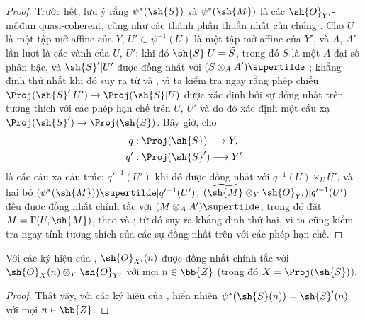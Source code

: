 \documentclass[oneside,10pt]{amsart}
\makeatletter
\newcommand{\ega@arrow}[2]{\mathchoice{#1}{#2}{#2}{#2}}
\renewcommand{\to}{\ega@arrow{\longrightarrow}{\rightarrow}}
\let\EGAOriginalLabel\label
\renewcommand{\label}[1]{\phantomsection\EGAOriginalLabel{#1}}
\makeatother
\begin{document}
\begin{proof}
Trước hết, lưu ý rằng $\psi^*(\sh{S})$ và $\psi^*(\sh{M})$ là các $\sh{O}_{Y'}$-môđun quasi-coherent, cũng như các thành phần thuần nhất của chúng .
Cho $U$ là một tập mở affine của $Y$, $U'\subset\psi^{-1}(U)$ là một tập mở affine của $Y'$, và $A$, $A'$ lần lượt là các vành của $U$, $U'$;
khi đó $\sh{S}|U=\widetilde{S}$, trong đó $S$ là một $A$-đại số phân bậc, và $\sh{S}'|U'$ được đồng nhất với $(S\otimes_A A')\supertilde$ ;
khẳng định thứ nhất khi đó suy ra từ  và , vì ta kiểm tra ngay rằng phép chiếu $\Proj(\sh{S}'|U')\to\Proj(\sh{S}|U)$ được xác định bởi sự đồng nhất trên tương thích với các phép hạn chế trên $U$, $U'$ và do đó xác định một cấu xạ $\Proj(\sh{S}')\to\Proj(\sh{S})$.
Bây giờ, cho
\begin{align*}
  q &: \Proj(\sh{S})\to Y,
\\q'&: \Proj(\sh{S}')\to Y'
\end{align*}
là các cấu xạ cấu trúc;
$q'^{-1}(U')$ khi đó được đồng nhất với $q^{-1}(U)\times_U U'$, và hai bó $(\psi^*(\sh{M}))\supertilde|q'^{-1}(U')$, $(\widetilde{\sh{M}}\otimes_Y\sh{O}_{Y'})|q'^{-1}(U')$ đều được đồng nhất chính tắc với $(M\otimes_A A')\supertilde$, trong đó đặt $M=\Gamma(U,\sh{M})$, theo  và ;
từ đó suy ra khẳng định thứ hai, vì ta cũng kiểm tra ngay tính tương thích của các sự đồng nhất trên với các phép hạn chế.
\end{proof}

\begin{corollary}[3.5.4]
\label{II.3.5.4}
Với các ký hiệu của , $\sh{O}_{X'}(n)$ được đồng nhất chính tắc với $\sh{O}_X(n)\otimes_Y\sh{O}_{Y'}$ với mọi $n\in\bb{Z}$ (trong đó $X=\Proj(\sh{S})$).
\end{corollary}

\begin{proof}
Thật vậy, với các ký hiệu của , hiển nhiên $\psi^*(\sh{S}(n))=\sh{S}'(n)$ với mọi $n\in\bb{Z}$.
\end{proof}
\end{document}
